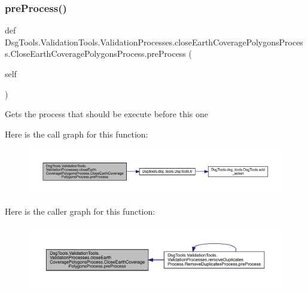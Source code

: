 \subsubsection{\texorpdfstring{pre\+Process()}{preProcess()}}
{\footnotesize\ttfamily def Dsg\+Tools.\+Validation\+Tools.\+Validation\+Processes.\+close\+Earth\+Coverage\+Polygons\+Process.\+Close\+Earth\+Coverage\+Polygons\+Process.\+pre\+Process (\begin{DoxyParamCaption}\item[{}]{self }\end{DoxyParamCaption})}

\begin{DoxyVerb}Gets the process that should be execute before this one
\end{DoxyVerb}
 Here is the call graph for this function\+:
\nopagebreak
\begin{figure}[H]
\begin{center}
\leavevmode
\includegraphics[width=350pt]{class_dsg_tools_1_1_validation_tools_1_1_validation_processes_1_1close_earth_coverage_polygons_pcbfc5684de655aabbd7cec48624aa747_ae2dc1713b12a6c716b1fcb8c4c05334b_cgraph}
\end{center}
\end{figure}
Here is the caller graph for this function\+:
\nopagebreak
\begin{figure}[H]
\begin{center}
\leavevmode
\includegraphics[width=350pt]{class_dsg_tools_1_1_validation_tools_1_1_validation_processes_1_1close_earth_coverage_polygons_pcbfc5684de655aabbd7cec48624aa747_ae2dc1713b12a6c716b1fcb8c4c05334b_icgraph}
\end{center}
\end{figure}
\mbox{\label{class_dsg_tools_1_1_validation_tools_1_1_validation_processes_1_1close_earth_coverage_polygons_pcbfc5684de655aabbd7cec48624aa747_ac9c3505a899b7cb026f6f19f42a46011}} 
